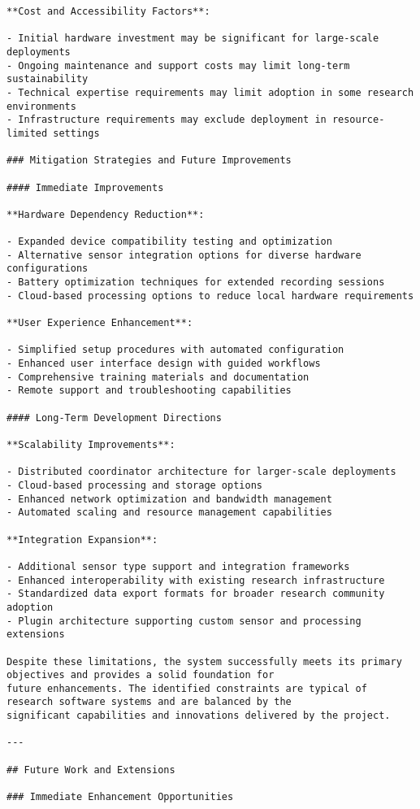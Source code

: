 \documentclass[11pt,a4paper]{report}
\begin{document}
\begin{verbatim}
**Cost and Accessibility Factors**:

- Initial hardware investment may be significant for large-scale deployments
- Ongoing maintenance and support costs may limit long-term sustainability
- Technical expertise requirements may limit adoption in some research environments
- Infrastructure requirements may exclude deployment in resource-limited settings

### Mitigation Strategies and Future Improvements

#### Immediate Improvements

**Hardware Dependency Reduction**:

- Expanded device compatibility testing and optimization
- Alternative sensor integration options for diverse hardware configurations
- Battery optimization techniques for extended recording sessions
- Cloud-based processing options to reduce local hardware requirements

**User Experience Enhancement**:

- Simplified setup procedures with automated configuration
- Enhanced user interface design with guided workflows
- Comprehensive training materials and documentation
- Remote support and troubleshooting capabilities

#### Long-Term Development Directions

**Scalability Improvements**:

- Distributed coordinator architecture for larger-scale deployments
- Cloud-based processing and storage options
- Enhanced network optimization and bandwidth management
- Automated scaling and resource management capabilities

**Integration Expansion**:

- Additional sensor type support and integration frameworks
- Enhanced interoperability with existing research infrastructure
- Standardized data export formats for broader research community adoption
- Plugin architecture supporting custom sensor and processing extensions

Despite these limitations, the system successfully meets its primary objectives and provides a solid foundation for
future enhancements. The identified constraints are typical of research software systems and are balanced by the
significant capabilities and innovations delivered by the project.

---

## Future Work and Extensions

### Immediate Enhancement Opportunities


\end{verbatim}
\end{document}
